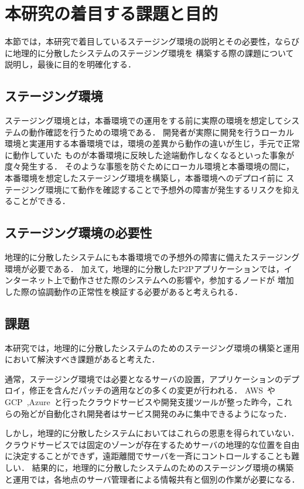 \section{本研究の着目する課題と目的}
\label{introduction:issue-and-aim}

本節では，本研究で着目しているステージング環境の説明とその必要性，ならびに地理的に分散したシステムのステージング環境を
構築する際の課題について説明し，最後に目的を明確化する．

\subsection{ステージング環境}

ステージング環境とは，本番環境での運用をする前に実際の環境を想定してシステムの動作確認を行うための環境である．
開発者が実際に開発を行うローカル環境と実運用する本番環境では，環境の差異から動作の違いが生じ，手元で正常に動作していた
ものが本番環境に反映した途端動作しなくなるといった事象が度々発生する．
そのような事態を防ぐためにローカル環境と本番環境の間に，本番環境を想定したステージング環境を構築し，本番環境へのデプロイ前に
ステージング環境にて動作を確認することで予想外の障害が発生するリスクを抑えることができる．

\subsection{ステージング環境の必要性}

地理的に分散したシステムにも本番環境での予想外の障害に備えたステージング環境が必要である．
加えて，地理的に分散したP2Pアプリケーションでは，インターネット上で動作させた際のシステムへの影響や，参加するノードが
増加した際の協調動作の正常性を検証する必要があると考えられる．

\subsection{課題}
\label{introduction:issue-and-aim:issue}

本研究では，地理的に分散したシステムのためのステージング環境の構築と運用において解決すべき課題があると考えた．

通常，ステージング環境では必要となるサーバの設置，アプリケーションのデプロイ，修正を含んだパッチの適用などの多くの変更が行われる．
AWS~\cite{AWS}やGCP~\cite{GCP},Azure~\cite{Azure}と行ったクラウドサービスや開発支援ツールが整った昨今，これらの殆どが自動化され開発者はサービス開発のみに集中できるようになった．

しかし，地理的に分散したシステムにおいてはこれらの恩恵を得られていない．
クラウドサービスでは固定のゾーンが存在するためサーバの地理的な位置を自由に決定することができず，遠距離間でサーバを一斉にコントロールすることも難しい．
結果的に，地理的に分散したシステムのためのステージング環境の構築と運用では，各地点のサーバ管理者による情報共有と個別の作業が必要になる．

